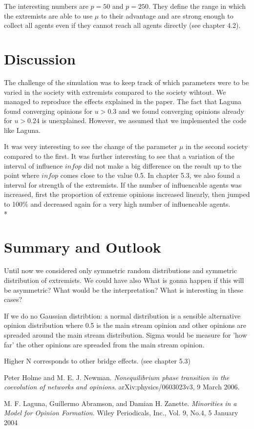 \documentclass[11pt]{article}
\begin{document}
The interesting numbers are $p = 50$ and $p = 250$. They define the range in which the extremists are able to use $\mu$ to their advantage and are strong enough to collect all agents even if they cannot reach all agents directly (see chapter 4.2).


\section{Discussion}
The challenge of the simulation was to keep track of which parameters were to be varied in the society with extremists compared to the society wihtout. We managed to reproduce the effects explained in the paper. The fact that Laguna found converging opinions for $u>0.3$ and we found converging opinions already for $u>0.24$ is unexplained. However, we assumed that we implemented the code like Laguna.

It was very interesting to see the change of the parameter $\mu$ in the second society compared to the first. It was further interesting to see that a variation of the interval of influence $infop$ did not make a big difference on the result up to the point where $infop$ comes close to the value 0.5. In chapter 5.3, we also found a interval for strength of the extremists. If the number of influencable agents was increased, first the proportion of extreme opinions increased linearly, then jumped to 100$\%$ and decreased again for a very high number of influencable agents.\\*


\section{Summary and Outlook}
Until now we considered only symmetric random distributions and symmetric distribution of extremists. We could have also 
What is gonna happen if this will be asymmetric? What would be the interpretation? What is interesting in these cases?


If we do no Gaussian distribtion: a normal distribution is a sensible alternative opinion distribution where 0.5 is the main stream opinion and other opinions are spreaded around the main stream distribution. Sigma would be measure for 'how far' the other opinions are spreaded from the main stream opinion.

Higher N corresponds to other bridge effects. (see chapter 5.3)


\begin{thebibliography}{99}
 Peter Holme and M. E. J. Newman. \textit{Nonequilibrium phase transition in the coevolution of networks and opinions}. arXiv:physics/0603023v3, 9 March 2006.

 M. F. Laguna, Guillermo Abramson, and Damian H. Zanette. \textit{Minorities in a Model for Opinion Formation}. Wiley Periodicals, Inc., Vol. 9, No.4, 5 January 2004

\end{thebibliography} 
\end{document}

